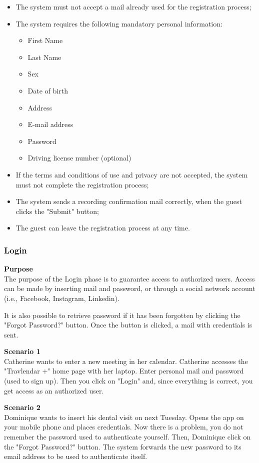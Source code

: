 \documentclass{article}
\begin{document}
	\begin{itemize}
		\item The system must not accept a mail already used for the registration process;
		\item The system requires the following mandatory personal information:
			\begin{itemize}
				\item First Name
				\item Last Name
				\item Sex
				\item Date of birth
				\item Address
				\item E-mail address
				\item Password
				\item Driving license number (optional)
			\end{itemize}
		\item If the terms and conditions of use and privacy are not accepted, the system must not complete the registration process;
		\item The system sends a recording confirmation mail correctly, when the guest clicks the "Submit" button;
		\item The guest can leave the registration process at any time.
	\end{itemize}

	\subsubsection{Login}
	
	\bigskip
	\noindent
	\textbf{Purpose} \\
	The purpose of the Login phase is to guarantee access to authorized users. Access can be made by inserting mail and password, or through a social network account (i.e., Facebook, Instagram, Linkedin).

	It is also possible to retrieve password if it has been forgotten by clicking the "Forgot Password?" button. Once the button is clicked, a mail with credentials is sent.

	\bigskip
	\noindent
	\textbf{Scenario 1} \\
	Catherine wants to enter a new meeting in her calendar. Catherine accesses the "Travlendar +" home page with her laptop. Enter personal mail and password (used to sign up). Then you click on "Login" and, since everything is correct, you get access as an authorized user.
	
	\bigskip
	\noindent
	\textbf{Scenario 2} \\
	Dominique wants to insert his dental visit on next Tuesday. Opens the app on your mobile phone and places credentials. Now there is a problem, you do not remember the password used to authenticate yourself. Then, Dominique click on the "Forgot Password?" button. The system forwards the new password to its email address to be used to authenticate itself.
	
\end{document}
